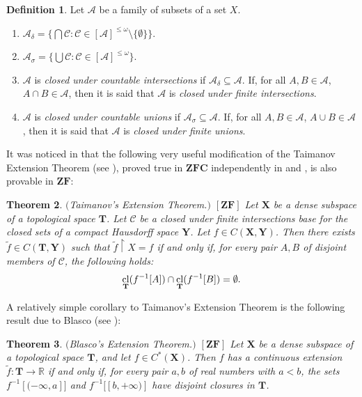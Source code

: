 \documentclass[12pt,twoside,leqno]{article}
\theoremstyle{plain}
\newtheorem{theorem}{Theorem}[section]
\theoremstyle{definition}
\newtheorem{definition}[theorem]{Definition}
\theoremstyle{remark}
\DeclareMathOperator{\cl}{{\rm cl}}
\begin{document}
\begin{definition}
	\label{s1:d9}
	Let $\mathcal{A}$ be a family of subsets of a set $X$.
	\begin{enumerate}
		\item[(i)] $\mathcal{A}_{\delta}=\{ \bigcap \mathcal{C}: \mathcal{C}\in [\mathcal{A}]^{\leq\omega}\setminus\{\emptyset\}\}$. 
		\item[(ii)] $\mathcal{A}_{\sigma}=\{ \bigcup \mathcal{C}: \mathcal{C}\in [\mathcal{A}]^{\leq\omega}\}.$
		\item[(iii)] $\mathcal{A}$ is \emph{closed under countable intersections} if $\mathcal{A}_{\delta}\subseteq\mathcal{A}$. If, for all $A,B\in\mathcal{A}$, $A\cap B\in\mathcal{A}$, then it is said that $\mathcal{A}$ is \emph{closed under finite intersections}.
		\item[(iv)] $\mathcal{A}$ is \emph{closed under countable unions} if $\mathcal{A}_{\sigma}\subseteq\mathcal{A}$. If, for all $A, B\in\mathcal{A}$, $A\cup B\in\mathcal{A}$, then it is said that $\mathcal{A}$ is \emph{closed under finite unions}.
	\end{enumerate}
\end{definition}

It was noticed in \cite{pw} that the following very useful modification of the Taimanov Extension Theorem (see \cite[Theorem 3.2.1]{en}), proved true in $\mathbf{ZFC}$ independently in \cite{blasco} and \cite{w1}, is also provable in $\mathbf{ZF}$:

\begin{theorem}
	\label{s1:t10}
	$($Taimanov's Extension Theorem.$)$ $[\mathbf{ZF}]$ Let $\mathbf{X}$ be a dense subspace of a topological space $\mathbf{T}$. Let $\mathcal{C}$ be a closed under finite intersections base for the closed sets of a compact Hausdorff space $\mathbf{Y}$. Let $f\in C(\mathbf{X}, \mathbf{Y})$. Then there exists $\tilde{f}\in C(\mathbf{T}, \mathbf{Y})$ such that $\tilde{f}\upharpoonright X= f$  if and only if, for every pair $A,B$ of disjoint members of $\mathcal{C}$, the following holds: 
	$$\cl_{\mathbf{T}}(f^{-1}[A])\cap\cl_{\mathbf{T}}(f^{-1}[B])=\emptyset.$$
\end{theorem}

A relatively simple corollary to Taimanov's Extension Theorem is the following result due to Blasco (see \cite{blasco}):

\begin{theorem}
	\label{s1:t11}
	$($Blasco's Extension Theorem.$)$ $[\mathbf{ZF}]$ Let $\mathbf{X}$ be a dense subspace of a topological space $\mathbf{T}$, and let $f\in C^{\ast}(\mathbf{X})$. Then $f$ has a continuous extension $\tilde{f}:\mathbf{T}\to\mathbb{R}$ if and only if, for every pair $a,b$ of real numbers with $a<b$, the sets $f^{-1}[(-\infty, a]]$ and $f^{-1}[[b, +\infty)]$ have disjoint closures in $\mathbf{T}$.
\end{theorem}
\end{document}
